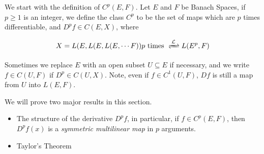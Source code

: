 \documentclass[../main-manifolds.tex]{subfiles}
\begin{document}
\newpage
{}
We start with the definition of $C^p(E,F)$. Let $E$ and $F$ be Banach Spaces, if $p\geq 1$ is an integer, we define the class $C^p$ to be the set of maps which are $p$ times differentiable, and $D^p f\in C(E, X)$, where 

\[
    X = L(E, L(E, L(E,\cdots F))  p\text{ times }  \Isomor{L} L(E^p, F)
\]

Sometimes we replace $E$ with an open subset $U\subseteq E$ if necessary, and we write $f\in C(U,F)$ if $D^p\in C(U,X)$. Note, even if $f\in C^1(U,F)$, $Df$ is still a map from $U$ into $L(E,F)$. 

We will prove two major results in this section.

\begin{itemize}
    \item The structure of the derivative $D^p f$, in particular, if $f\in C^p(E,F)$, then $D^pf(x)$ is a \emph{symmetric multilinear map} in $p$ arguments. 
    \item Taylor's Theorem
\end{itemize}
\end{document}
